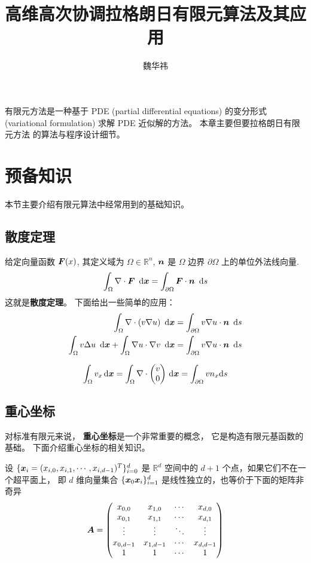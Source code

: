 \documentclass{article}
\begin{document}
\title{高维高次协调拉格朗日有限元算法及其应用}
\author{魏华祎}
\date{\chntoday}
\maketitle

有限元方法是一种基于 PDE (partial differential equations) 的变分形式
(variational formulation) 求解 PDE 近似解的方法。 本章主要但要拉格朗日有限元方法
的算法与程序设计细节。

\section{预备知识}
本节主要介绍有限元算法中经常用到的基础知识。
\subsection{散度定理}
给定向量函数 ${\boldsymbol F}(x)$, 其定义域为 $\Omega\in\mathbb R^n$, ${\boldsymbol n}$ 是 $\Omega$ 边界 $\partial \Omega$ 上的单位外法线向量.
$$
\int_{\Omega} \nabla\cdot{\boldsymbol F}~ \,\mathrm d {\boldsymbol x} = \int_{\partial \Omega}{\boldsymbol F}\cdot{\boldsymbol n} ~\,\mathrm d s
$$
这就是{\bf 散度定理}。 下面给出一些简单的应用：
$$
\begin{aligned}
\int_{\Omega} \nabla\cdot(v\nabla u)~\,\mathrm d {\boldsymbol x} &= \int_{\partial\Omega} v\nabla
u\cdot{\boldsymbol n}~\,\mathrm d s\\
\int_{\Omega} v\Delta u~\,\mathrm d {\boldsymbol x} + \int_{\Omega}\nabla u\cdot\nabla v~\,\mathrm d {\boldsymbol x}
&= \int_{\partial\Omega} v\nabla u\cdot{\boldsymbol n}~\,\mathrm d s
\end{aligned}
$$

$$
\int_\Omega v_x \,\mathrm d{\boldsymbol x} = \int_\Omega \nabla\cdot \begin{pmatrix}
v\\0
\end{pmatrix} \,\mathrm d {\boldsymbol x} =
\int_{\partial \Omega} vn_x \mathrm d s
$$

\subsection{重心坐标}

对标准有限元来说， {\bf 重心坐标}是一个非常重要的概念， 它是构造有限元基函数的
基础。 下面介绍重心坐标的相关知识。

设 $\{{\boldsymbol x}_i = (x_{i,0}, x_{i, 1}, \cdots, x_{i, d-1})^T\}_{i=0}^{d}$ 是 $\mathbb
    R^d$ 空间中的 $d+1$ 个点，如果它们不在一个超平面上， 即 $d$ 维向量集合
    $\{{\boldsymbol x}_0{\boldsymbol x}_i\}_{i=1}^d$ 是线性独立的，也等价于下面的矩阵非奇异
\begin{equation}
    {\boldsymbol A} =\begin{pmatrix}
        x_{0, 0} & x_{1, 0} & \cdots & x_{d, 0} \\
        x_{0, 1} & x_{1, 1} & \cdots & x_{d, 1} \\
        \vdots   & \vdots   & \ddots & \vdots \\
        x_{0, d-1} & x_{1, d-1} & \cdots & x_{d, d-1}\\
        1 & 1 & \cdots & 1
    \end{pmatrix}
\end{equation}
\end{document}
